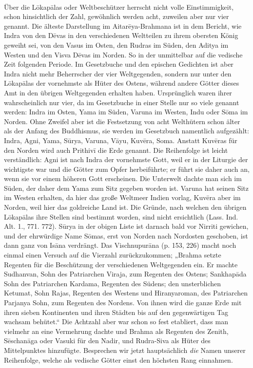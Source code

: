 \documentclass{article}
\begin{document}
\paragraph{}
Über die L\={o}kap\={a}las oder Weltbeschützer herrscht nicht volle Einstimmigkeit, schon hinsichtlich der Zahl, gewöhnlich werden acht, zuweilen aber nur vier genannt. Die älteste Darstellung im Aitar\={e}ya-Brahmana ist in dem Bericht, wie Indra von den D\={e}vas in den verschiedenen Weltteilen zu ihrem obersten König geweiht sei, von den Vasus im Osten, den Rudras im Süden, den Aditya im Westen und den Visva D\={e}vas im Norden. So in der unmittelbar auf die vedische Zeit folgenden Periode. Im Gesetzbuche und den epischen Gedichten ist aber Indra nicht mehr Beherrscher der vier Weltgegenden, sondern nur unter den L\={o}kap\={a}las der vornehmste als Hüter des Ostens, während andere Götter dieses Amt in den übrigen Weltgegenden erhalten haben. Ursprünglich waren ihrer wahrscheinlich nur vier, da im Gesetzbuche in einer Stelle nur so viele genannt werden: Indra im Osten, Yama im Süden, Varuna im Westen, Indu oder S\={o}ma im Norden. Ohne Zweifel aber ist die Festsetzung von acht Welthütern schon älter als der Anfang des Buddhismus, sie werden im Gesetzbuch namentlich aufgezählt: Indra, Agni, Yama, S\={u}rya, Varuna, V\={a}yu, Kuv\={e}ra, Soma. Anstatt Kuv\={e}ras für den Norden wird auch Prithiv\={i} die Erde genannt. Die Reihenfolge ist leicht verständlich: Agni ist nach Indra der vornehmste Gott, weil er in der Liturgie der wichtigste war und die Götter zum Opfer herbeiführte; er führt sie daher auch an, wenn sie vor einem höheren Gott erscheinen. Die Unterwelt dachte man sich im Süden, der daher dem Yama zum Sitz gegeben worden ist. Varuna hat seinen Sitz im Westen erhalten, da hier das große Weltmeer Indien vorlag, Kuv\={e}ra aber im Norden, weil hier das goldreiche Land ist. Die Gründe, nach welchen den übrigen L\={o}kap\={a}las ihre Stellen sind bestimmt worden, sind nicht ersichtlich (Lass. Ind. Alt. 1., 771. 772). S\={u}rya in der obigen Liste ist darnach bald vor Nirriti gewichen, und der ehrwürdige Name S\={o}mas, erst von Norden nach Nordosten geschoben, ist dann ganz von Is\={a}na verdrängt. Das Vischnupur\={a}na (p. 153, 226) macht noch einmal einen Versuch auf die Vierzahl zurückzukommen; „Brahma setzte Regenten für die Beschützung der verschiedenen Weltgegenden ein. Er machte Sudhanvan, Sohn des Patriarchen Viraja, zum Regenten des Ostens; Sankhap\={a}da Sohn des Patriarchen Kardama, Regenten des Südens; den unsterblichen Ketumat, Sohn Rajas, Regenten des Westens und Hiranyaroman, des Patriarchen Parjanya Sohn, zum Regenten des Nordens. Von ihnen wird die ganze Erde mit ihren sieben Kontinenten und ihren Städten bis auf den gegenwärtigen Tag wachsam behütet.“ Die Achtzahl aber war schon so fest etabliert, dass man vielmehr an eine Vermehrung dachte und Brahma als Regenten des Zenith, S\={e}schan\={a}ga oder Vasuki für den Nadir, und Rudra-Siva als Hüter des Mittelpunktes hinzufügte. Besprechen wir jetzt hauptsächlich \emph{die} Namen unserer Reihenfolge, welche als vedische Götter einst den höchsten Rang einnahmen.
\end{document}
